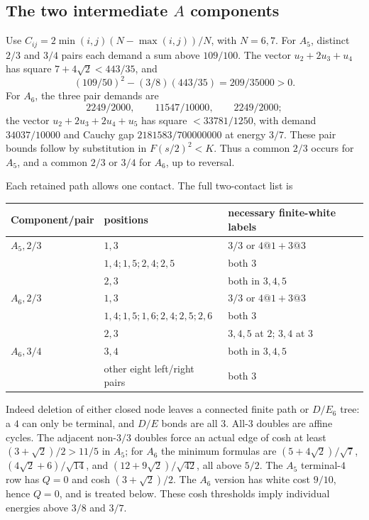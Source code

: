 \documentclass[11pt]{article}
\theoremstyle{definition}
\theoremstyle{remark}
\begin{document}
\subsection{The two intermediate \texorpdfstring{$A$}{A} components}

Use $C_{ij}=2\min(i,j)(N-\max(i,j))/N$, with $N=6,7$.
For $A_5$, distinct $2/3$ and $3/4$ pairs each demand a sum above
$109/100$. The vector $u_2+2u_3+u_4$ has square
$7+4\sqrt2<443/35$, and
\[
(109/50)^2-(3/8)(443/35)=209/35000>0.
\]
For $A_6$, the three pair demands are
\[
2249/2000,\qquad11547/10000,\qquad2249/2000;
\]
the vector $u_2+2u_3+2u_4+u_5$ has square
$<33781/1250$, with demand $34037/10000$ and Cauchy gap
$2181583/700000000$ at energy $3/7$.
These pair bounds follow by substitution in
$F(s/2)^2<K$. Thus a common $2/3$ occurs for $A_5$, and a common
$2/3$ or $3/4$ for $A_6$, up to reversal.

Each retained path allows one contact. The full two-contact list is
\begin{center}\small
\begin{tabular}{lll}
\toprule
Component/pair&positions&necessary finite-white labels\\ \midrule
$A_5,2/3$&$1,3$&$3/3$ or $4@1+3@3$\\
&$1,4;1,5;2,4;2,5$&both $3$\\
&$2,3$&both in $3,4,5$\\
$A_6,2/3$&$1,3$&$3/3$ or $4@1+3@3$\\
&$1,4;1,5;1,6;2,4;2,5;2,6$&both $3$\\
&$2,3$&$3,4,5$ at $2$; $3,4$ at $3$\\
$A_6,3/4$&$3,4$&both in $3,4,5$\\
&other eight left/right pairs&both $3$\\ \bottomrule
\end{tabular}\end{center}
Indeed deletion of either closed node leaves a connected finite
path or $D/E_6$ tree: a $4$ can only be terminal, and $D/E$ bonds
are all $3$. All-$3$ doubles are affine cycles. The adjacent
non-$3/3$ doubles force an actual edge of cosh at least
$(3+\sqrt2)/2>11/5$ in $A_5$; for $A_6$ the minimum formulas are
$(5+4\sqrt2)/\sqrt7$, $(4\sqrt2+6)/\sqrt{14}$, and
$(12+9\sqrt2)/\sqrt{42}$, all above $5/2$.
The $A_5$ terminal-$4$ row has $Q=0$ and cosh
$(3+\sqrt2)/2$. The $A_6$ version has white cost $9/10$, hence
$Q=0$, and is treated below. These cosh thresholds imply individual
energies above $3/8$ and $3/7$.
\end{document}
